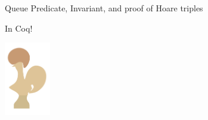 \documentclass[9pt]{beamer}
\begin{document}
\begin{frame}{Queue Predicate, Invariant, and proof of Hoare triples}
  \begin{center}
    {\fontsize{40}{60}\selectfont In Coq!}\\
  \end{center}
  \begin{center}
    \includegraphics[width=0.15\textwidth]{coq-logo-large.png}
  \end{center}
\end{frame}

\end{document}
